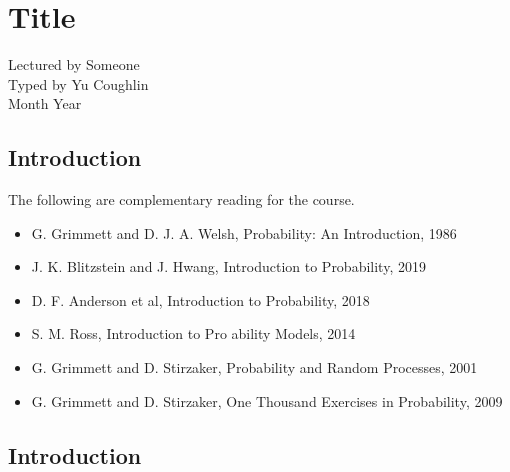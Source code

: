\documentclass[../Year2/Year2.tex]{subfiles}
\begin{document}
\chapter{Title}
\renewcommand*\thesection{\arabic{section}}
Lectured by Someone \\ Typed by Yu Coughlin \\
Month Year

\section*{Introduction}

The following are complementary reading for the course.
\begin{itemize}
    \item G. Grimmett and D. J. A. Welsh, Probability: An Introduction, 1986
    \item J. K. Blitzstein and J. Hwang, Introduction to Probability, 2019
    \item D. F. Anderson et al, Introduction to Probability, 2018
    \item S. M. Ross, Introduction to Pro ability Models, 2014
    \item G. Grimmett and D. Stirzaker, Probability and Random Processes, 2001
    \item G. Grimmett and D. Stirzaker, One Thousand Exercises in Probability, 2009
\end{itemize}

\tableofcontents\pagebreak


\section{Introduction}
\end{document}
